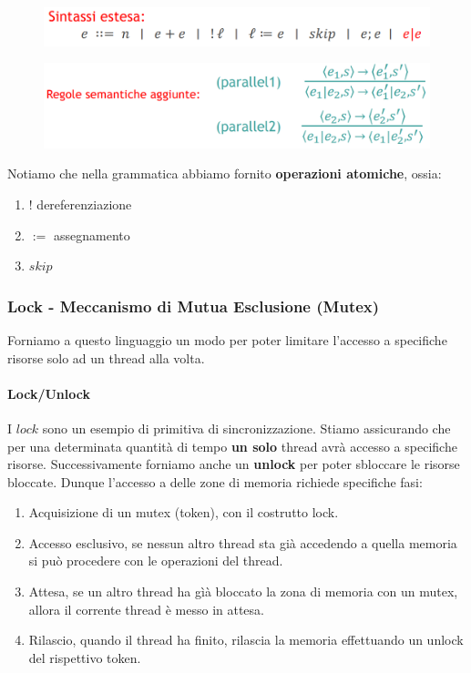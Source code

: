 \documentclass{article}
\begin{document}
\begin{figure}[htbp]
    \center
    \includegraphics[scale=0.3]{img/sintassi1_modello.png}
\end{figure}

\begin{figure}[htbp]
    \center
    \includegraphics[scale=0.3]{img/semantica3_modello.png}
\end{figure}

Notiamo che nella grammatica abbiamo fornito \textbf{operazioni atomiche}, ossia:

\begin{enumerate}
    \item $!$ dereferenziazione
    \item $:=$ assegnamento
    \item $skip$
\end{enumerate}

\subsubsection{Lock - Meccanismo di Mutua Esclusione (Mutex)}

Forniamo a questo linguaggio un modo per poter limitare l'accesso a specifiche risorse solo ad un thread alla volta.

\paragraph{Lock/Unlock} I $lock$ sono un esempio di primitiva di sincronizzazione. Stiamo assicurando che per una determinata quantità di tempo \textbf{un solo} thread avrà accesso a specifiche risorse. Successivamente forniamo anche un \textbf{unlock} per poter sbloccare le risorse bloccate. Dunque l'accesso a delle zone di memoria richiede specifiche fasi:
\begin{enumerate}
    \item Acquisizione di un mutex (token), con il costrutto lock.
    \item Accesso esclusivo, se nessun altro thread sta già accedendo a quella memoria si può procedere con le operazioni del thread.
    \item Attesa, se un altro thread ha gìà bloccato la zona di memoria con un mutex, allora il corrente thread è messo in attesa.
    \item Rilascio, quando il thread ha finito, rilascia la memoria effettuando un unlock del rispettivo token.
\end{enumerate}
\end{document}
